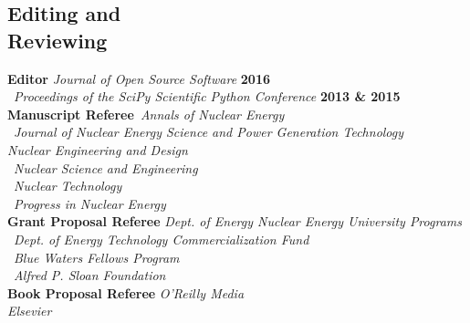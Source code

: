 \documentclass[margin,line]{resume}
\begin{document}
\begin{resume}
    \section{\mysidestyle Editing and\\Reviewing}
    \textbf{Editor} \hfill \emph{Journal of Open Source Software} \textbf{2016}\\%
                    \mbox{}~\hfill \emph{Proceedings of the SciPy Scientific Python Conference} \textbf{2013 \& 2015}\vspace{2mm}\\%
    \textbf{Manuscript Referee}~\hfill\emph{Annals of Nuclear Energy}\\%
                            \mbox{}~\hfill \emph{Journal of Nuclear Energy Science and Power Generation Technology} \\%
                            \mbox{}\hfill \emph{Nuclear Engineering and Design}\\%
                            \mbox{}~\hfill\emph{Nuclear Science and Engineering}\\%
                            \mbox{}~\hfill\emph{Nuclear Technology}\\%
                            \mbox{}~\hfill\emph{Progress in Nuclear Energy}\vspace{2mm}\\%
    \textbf{Grant Proposal Referee} \hfill \emph{Dept. of Energy Nuclear Energy University Programs}\\%
                            \mbox{}~\hfill\emph{Dept. of Energy Technology Commercialization Fund}\\%
                            \mbox{}~\hfill\emph{Blue Waters Fellows Program}\vspace{2mm}\\%
                            \mbox{}~\hfill\emph{Alfred P. Sloan Foundation}\vspace{2mm}\\%
    \textbf{Book Proposal Referee} \hfill\emph{O'Reilly Media}\\%
                            \mbox{}\hfill\emph{Elsevier}\vspace{2mm}\\%

\end{resume}
\end{document}
